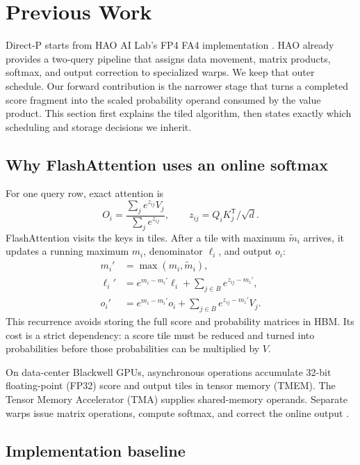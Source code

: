 \section{Previous Work}
\label{sec:hao-background}

Direct-P starts from HAO AI Lab's FP4 FA4 implementation
\cite{hao2026fp4flashattention}.  HAO already provides a two-query pipeline
that assigns data movement, matrix products, softmax, and output correction to
specialized warps.  We keep that outer schedule.  Our forward contribution is
the narrower stage that turns a completed score fragment into the scaled
probability operand consumed by the value product.  This section first
explains the tiled algorithm, then states exactly which scheduling and storage
decisions we inherit.

\subsection{Why FlashAttention uses an online softmax}

For one query row, exact attention is
\begin{equation}
  O_i=\frac{\sum_j e^{z_{ij}}V_j}{\sum_j e^{z_{ij}}},
  \qquad z_{ij}=Q_iK_j^\mathsf{T}/\sqrt d.
  \label{eq:exact-attention}
\end{equation}
FlashAttention visits the keys in tiles.  After a tile with maximum
$\widetilde m_i$ arrives, it updates a running maximum $m_i$, denominator
$\ell_i$, and output $o_i$:
\begin{align}
  m_i' &= \max(m_i,\widetilde m_i), \\
  \ell_i' &= e^{m_i-m_i'}\ell_i+
    \sum_{j\in B}e^{z_{ij}-m_i'}, \\
  o_i' &= e^{m_i-m_i'}o_i+
    \sum_{j\in B}e^{z_{ij}-m_i'}V_j.
  \label{eq:online-recurrence}
\end{align}
This recurrence avoids storing the full score and probability matrices in
HBM.  Its cost is a strict dependency: a score tile must be reduced and turned
into probabilities before those probabilities can be multiplied by $V$.

On data-center Blackwell GPUs, asynchronous \tcgen{} operations accumulate
32-bit floating-point (FP32) score and output tiles in tensor memory (TMEM).
The Tensor Memory Accelerator (TMA) supplies shared-memory operands.  Separate
warps issue matrix operations, compute softmax, and correct the online output
\cite{nvidia2026ptx,zadouri2026flashattention4}.

\subsection{Implementation baseline}

